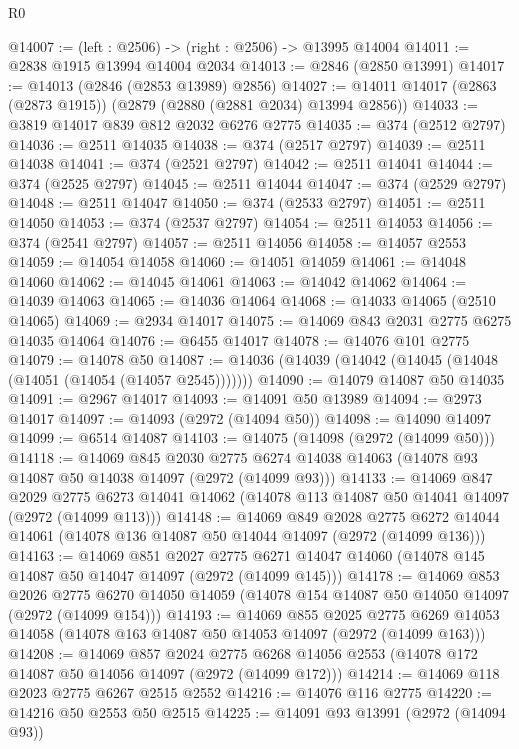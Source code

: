 \begin{lexlean}{R0}
\begin{coremodule}
@14007 := (left : @2506) -> (right : @2506) -> @13995 @14004
@14011 := @2838 @1915 @13994 @14004 @2034
@14013 := @2846 (@2850 @13991)
@14017 := @14013 (@2846 (@2853 @13989) @2856)
@14027 := @14011 @14017 (@2863 (@2873 @1915)) (@2879 (@2880 (@2881 @2034) @13994 @2856))
@14033 := @3819 @14017 @839 @812 @2032 @6276 @2775
@14035 := @374 (@2512 @2797)
@14036 := @2511 @14035
@14038 := @374 (@2517 @2797)
@14039 := @2511 @14038
@14041 := @374 (@2521 @2797)
@14042 := @2511 @14041
@14044 := @374 (@2525 @2797)
@14045 := @2511 @14044
@14047 := @374 (@2529 @2797)
@14048 := @2511 @14047
@14050 := @374 (@2533 @2797)
@14051 := @2511 @14050
@14053 := @374 (@2537 @2797)
@14054 := @2511 @14053
@14056 := @374 (@2541 @2797)
@14057 := @2511 @14056
@14058 := @14057 @2553
@14059 := @14054 @14058
@14060 := @14051 @14059
@14061 := @14048 @14060
@14062 := @14045 @14061
@14063 := @14042 @14062
@14064 := @14039 @14063
@14065 := @14036 @14064
@14068 := @14033 @14065 (@2510 @14065)
@14069 := @2934 @14017
@14075 := @14069 @843 @2031 @2775 @6275 @14035 @14064
@14076 := @6455 @14017
@14078 := @14076 @101 @2775
@14079 := @14078 @50
@14087 := @14036 (@14039 (@14042 (@14045 (@14048 (@14051 (@14054 (@14057 @2545)))))))
@14090 := @14079 @14087 @50 @14035
@14091 := @2967 @14017
@14093 := @14091 @50 @13989
@14094 := @2973 @14017
@14097 := @14093 (@2972 (@14094 @50))
@14098 := @14090 @14097
@14099 := @6514 @14087
@14103 := @14075 (@14098 (@2972 (@14099 @50)))
@14118 := @14069
    @845
    @2030
    @2775
    @6274
    @14038
    @14063
    (@14078 @93 @14087 @50 @14038 @14097 (@2972 (@14099 @93)))
@14133 := @14069
    @847
    @2029
    @2775
    @6273
    @14041
    @14062
    (@14078 @113 @14087 @50 @14041 @14097 (@2972 (@14099 @113)))
@14148 := @14069
    @849
    @2028
    @2775
    @6272
    @14044
    @14061
    (@14078 @136 @14087 @50 @14044 @14097 (@2972 (@14099 @136)))
@14163 := @14069
    @851
    @2027
    @2775
    @6271
    @14047
    @14060
    (@14078 @145 @14087 @50 @14047 @14097 (@2972 (@14099 @145)))
@14178 := @14069
    @853
    @2026
    @2775
    @6270
    @14050
    @14059
    (@14078 @154 @14087 @50 @14050 @14097 (@2972 (@14099 @154)))
@14193 := @14069
    @855
    @2025
    @2775
    @6269
    @14053
    @14058
    (@14078 @163 @14087 @50 @14053 @14097 (@2972 (@14099 @163)))
@14208 := @14069
    @857
    @2024
    @2775
    @6268
    @14056
    @2553
    (@14078 @172 @14087 @50 @14056 @14097 (@2972 (@14099 @172)))
@14214 := @14069 @118 @2023 @2775 @6267 @2515 @2552
@14216 := @14076 @116 @2775
@14220 := @14216 @50 @2553 @50 @2515
@14225 := @14091 @93 @13991 (@2972 (@14094 @93))

\end{coremodule}
\end{lexlean}
